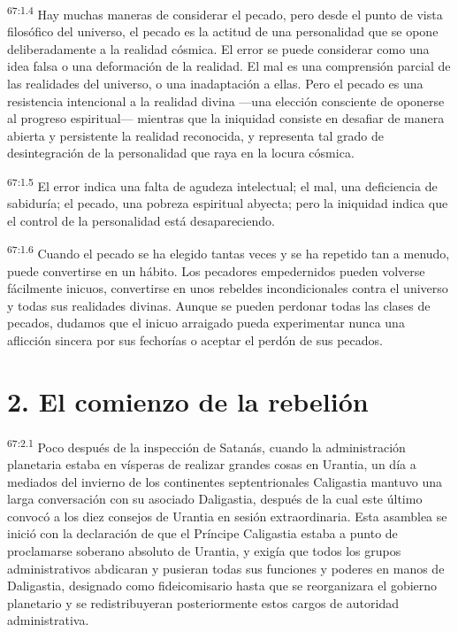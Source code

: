\par
\textsuperscript{67:1.4} Hay muchas maneras de considerar el pecado, pero desde el punto de vista filosófico del universo, el pecado es la actitud de una personalidad que se opone deliberadamente a la realidad cósmica. El error se puede considerar como una idea falsa o una deformación de la realidad. El mal es una comprensión parcial de las realidades del universo, o una inadaptación a ellas. Pero el pecado es una resistencia intencional a la realidad divina ---una elección consciente de oponerse al progreso espiritual--- mientras que la iniquidad consiste en desafiar de manera abierta y persistente la realidad reconocida, y representa tal grado de desintegración de la personalidad que raya en la locura cósmica.

\par
\textsuperscript{67:1.5} El error indica una falta de agudeza intelectual; el mal, una deficiencia de sabiduría; el pecado, una pobreza espiritual abyecta; pero la iniquidad indica que el control de la personalidad está desapareciendo.

\par
\textsuperscript{67:1.6} Cuando el pecado se ha elegido tantas veces y se ha repetido tan a menudo, puede convertirse en un hábito. Los pecadores empedernidos pueden volverse fácilmente inicuos, convertirse en unos rebeldes incondicionales contra el universo y todas sus realidades divinas. Aunque se pueden perdonar todas las clases de pecados, dudamos que el inicuo arraigado pueda experimentar nunca una aflicción sincera por sus fechorías o aceptar el perdón de sus pecados.

\section*{2. El comienzo de la rebelión}
\par
\textsuperscript{67:2.1} Poco después de la inspección de Satanás, cuando la administración planetaria estaba en vísperas de realizar grandes cosas en Urantia, un día a mediados del invierno de los continentes septentrionales Caligastia mantuvo una larga conversación con su asociado Daligastia, después de la cual este último convocó a los diez consejos de Urantia en sesión extraordinaria. Esta asamblea se inició con la declaración de que el Príncipe Caligastia estaba a punto de proclamarse soberano absoluto de Urantia, y exigía que todos los grupos administrativos abdicaran y pusieran todas sus funciones y poderes en manos de Daligastia, designado como fideicomisario hasta que se reorganizara el gobierno planetario y se redistribuyeran posteriormente estos cargos de autoridad administrativa.


